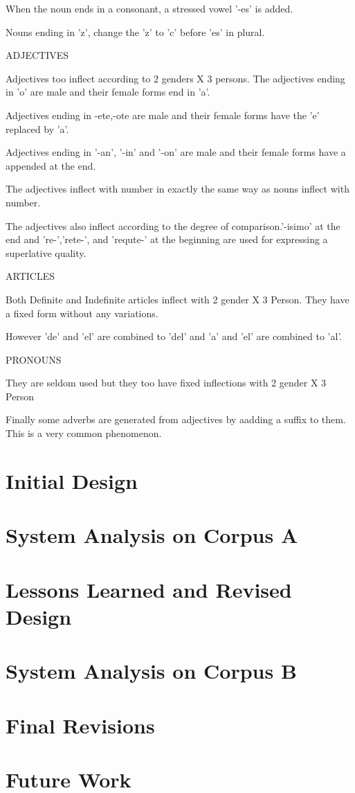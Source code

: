 \documentclass[11pt,letterpaper]{article}
\begin{document}
	When the noun ends in a consonant, a stressed vowel '-es' is added.

Nouns ending in 'z', change the 'z' to 'c' before 'es' in plural.


ADJECTIVES

Adjectives too inflect according to 2 genders X 3 persons. The adjectives ending in 'o' are male and their female forms end in 'a'.

Adjectives ending in -ete,-ote are male and their female forms have the 'e' replaced by 'a'.

Adjectives ending in '-an', '-in' and '-on' are male and their female forms have a appended at the end.

The adjectives inflect with number in exactly the same way as nouns inflect with number.

The adjectives also inflect according to the degree of comparison.'-isimo' at the end and 're-','rete-', and 'requte-' at the beginning are used for expressing a superlative quality.


ARTICLES

Both Definite and Indefinite articles inflect with 2 gender X 3 Person. They have a fixed form without any variations.

However 'de' and 'el' are combined to 'del' and 'a' and 'el' are combined to 'al'.

PRONOUNS

They are seldom used but they too have fixed inflections with 2 gender X 3 Person

Finally some adverbs are generated from adjectives by aadding a suffix to them. This is a very common phenomenon.  
\section{Initial Design}

\section{System Analysis on Corpus A}

\section{Lessons Learned and Revised Design}

\section{System Analysis on Corpus B}

\section{Final Revisions}

\section{Future Work}







\label{lastpage}
\end{document}
